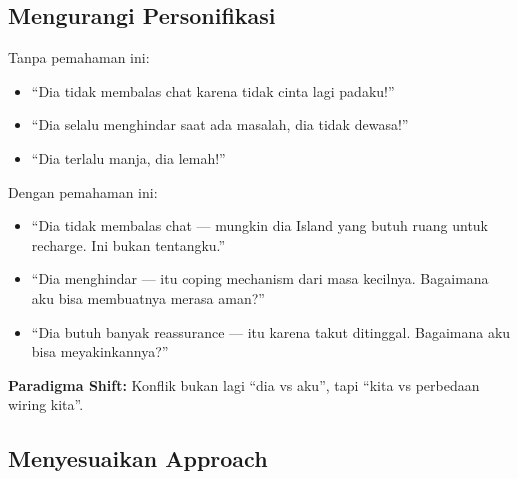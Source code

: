 \subsection{Mengurangi Personifikasi}

Tanpa pemahaman ini:
\begin{itemize}
    \item ``Dia tidak membalas chat karena tidak cinta lagi padaku!''
    \item ``Dia selalu menghindar saat ada masalah, dia tidak dewasa!''
    \item ``Dia terlalu manja, dia lemah!''
\end{itemize}

Dengan pemahaman ini:
\begin{itemize}
    \item ``Dia tidak membalas chat --- mungkin dia Island yang butuh ruang untuk recharge. Ini bukan tentangku.''
    \item ``Dia menghindar --- itu coping mechanism dari masa kecilnya. Bagaimana aku bisa membuatnya merasa aman?''
    \item ``Dia butuh banyak reassurance --- itu karena takut ditinggal. Bagaimana aku bisa meyakinkannya?''
\end{itemize}

\begin{insightbox}
\textbf{Paradigma Shift:} Konflik bukan lagi ``dia vs aku'', tapi ``kita vs perbedaan wiring kita''.
\end{insightbox}

\subsection{Menyesuaikan Approach}

